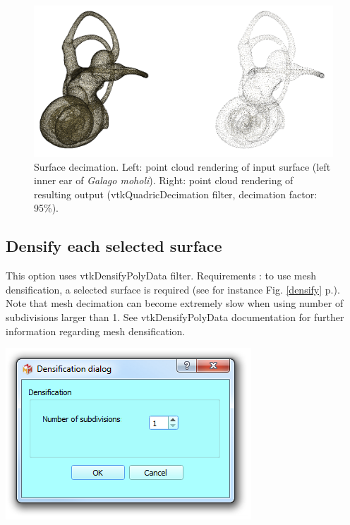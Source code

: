 \begin{figure}
  \centering
  \includegraphics[scale=0.35]{images/09/structure/decimation_example.png} 
	\caption{Surface decimation. Left: point cloud rendering of input surface (left inner ear of \textit{Galago moholi}). Right: point cloud rendering of resulting output (vtkQuadricDecimation filter,
decimation factor: 95\%). 
}
\label{decimate}
 
\end{figure}

\subsection{Densify each selected surface}

\noindent
\begin{minipage}{0.5\textwidth}

This option uses vtkDensifyPolyData filter.
Requirements : to use mesh densification, a selected
surface is required (see for instance Fig. \ref{densify} p.\pageref{densify}).
Note that mesh decimation can become extremely slow
when using number of subdivisions larger than 1.
See vtkDensifyPolyData documentation for further information regarding mesh densification.

\end{minipage}    
\begin{minipage}{0.5\textwidth}\centering
  \includegraphics[scale=0.5]{images/09/structure/densification_dialog.png}
 \end{minipage} 
\noindent

